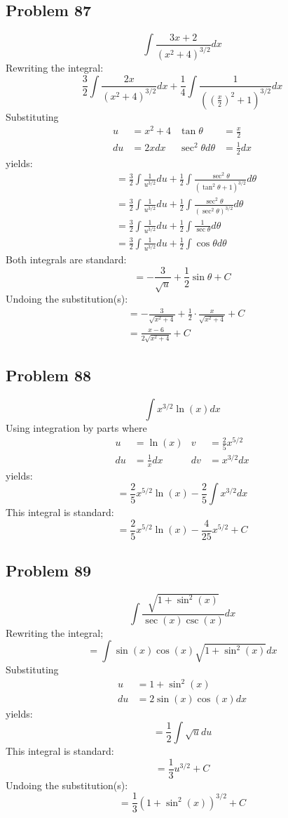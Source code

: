 \documentclass{article}
\begin{document}
\subsection*{Problem 87}
$$\int\frac{3x+2}{\left(x^2+4\right)^{3/2}}dx$$
Rewriting the integral:
$$\frac{3}{2}\int\frac{2x}{(x^2+4)^{3/2}}dx+\frac{1}{4}\int\frac{1}{\left(\left(\frac{x}{2}\right)^2+1\right)^{3/2}}dx$$
Substituting
\begin{align*}
u&=x^2+4 &\tan\theta&=\frac{x}{2} \\
du&=2xdx &\sec^2\theta d\theta&=\frac{1}{2}dx
\end{align*}
yields:
\begin{align*}
&=\frac{3}{2}\int\frac{1}{u^{3/2}}du+\frac{1}{2}\int\frac{\sec^2\theta}{(\tan^2\theta+1)^{3/2}}d\theta \\
&=\frac{3}{2}\int\frac{1}{u^{3/2}}du+\frac{1}{2}\int\frac{\sec^2\theta}{(\sec^2\theta)^{3/2}}d\theta \\
&=\frac{3}{2}\int\frac{1}{u^{3/2}}du+\frac{1}{2}\int\frac{1}{\sec\theta}d\theta \\
&=\frac{3}{2}\int\frac{1}{u^{3/2}}du+\frac{1}{2}\int\cos\theta d\theta
\end{align*}
Both integrals are standard:
$$=-\frac{3}{\sqrt{u}}+\frac{1}{2}\sin\theta+C$$
Undoing the substitution(s):
\begin{align*}
&=-\frac{3}{\sqrt{x^2+4}}+\frac{1}{2}\cdot\frac{x}{\sqrt{x^2+4}}+C \\
&=\frac{x-6}{2\sqrt{x^2+4}}+C
\end{align*}
\subsection*{Problem 88}
$$\int x^{3/2}\ln\left(x\right)dx$$
Using integration by parts where
\begin{align*}
u&=\ln(x) &v&=\frac{2}{5}x^{5/2} \\
du&=\frac{1}{x}dx &dv&=x^{3/2}dx
\end{align*}
yields:
$$=\frac{2}{5}x^{5/2}\ln(x)-\frac{2}{5}\int x^{3/2}dx$$
This integral is standard:
$$=\frac{2}{5}x^{5/2}\ln(x)-\frac{4}{25}x^{5/2}+C$$
\subsection*{Problem 89}
$$\int\frac{\sqrt{1+\sin^2\left(x\right)}}{\sec\left(x\right)\csc\left(x\right)}dx$$
Rewriting the integral;
$$=\int\sin(x)\cos(x)\sqrt{1+\sin^2(x)}dx$$
Substituting
\begin{align*}
u&=1+\sin^2(x) \\
du&=2\sin(x)\cos(x)dx
\end{align*}
yields:
$$=\frac{1}{2}\int\sqrt{u}du$$
This integral is standard:
$$=\frac{1}{3}u^{3/2}+C$$
Undoing the substitution(s):
$$=\frac{1}{3}\left(1+\sin^2(x)\right)^{3/2}+C$$
\end{document}
